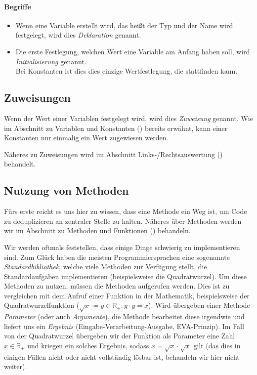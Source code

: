	\paragraph{Begriffe}
		\begin{itemize}
			\item Wenn eine Variable erstellt wird, das heißt der Typ und der Name wird festgelegt, wird dies \textit{Deklaration} genannt.
			\item Die erste Festlegung, welchen Wert eine Variable am Anfang haben soll, wird \textit{Initialisierung} genannt. \\ Bei Konstanten ist dies dies einzige Wertfestlegung, die stattfinden kann.
		\end{itemize}

\subsection{Zuweisungen} \imperativeMark \oopMark
	
	Wenn der Wert einer Variablen festgelegt wird, wird dies \textit{Zuweisung} genannt. Wie im Abschnitt zu Variablen und Konstanten () bereits erwähnt, kann einer Konstanten nur einmalig ein Wert zugewiesen werden.
	
	Näheres zu Zuweisungen wird im Abschnitt Links-/Rechtsauswertung () behandelt.

\subsection{Nutzung von Methoden} \functionalMark \imperativeMark \oopMark
	
	Fürs erste reicht es uns hier zu wissen, dass eine Methode ein Weg ist, um Code zu deduplizieren an zentraler Stelle zu halten. Näheres über Methoden werden wir im Abschnitt zu Methoden und Funktionen () behandeln.
	
	Wir werden oftmals feststellen, dass einige Dinge schwierig zu implementieren sind. Zum Glück haben die meisten Programmiersprachen eine sogenannte \textit{Standardbibliothek}, welche viele Methoden zur Verfügung stellt, die Standardaufgaben implementieren (beispielsweise die Quadratwurzel). Um diese Methoden zu nutzen, müssen die Methoden aufgerufen werden. Dies ist zu vergleichen mit dem Aufruf einer Funktion in der Mathematik, beispielsweise der Quadratwurzelfunktion ($ \sqrt{x} \coloneqq y \in \mathbb{R} _ + : y \cdot y = x $). Wird übergeben einer Methode \textit{Parameter} (oder auch \textit{Argumente}), die Methode bearbeitet diese irgendwie und liefert uns ein \textit{Ergebnis} (Eingabe-Verarbeitung-Ausgabe, EVA-Prinzip). Im Fall von der Quadratwurzel übergeben wir der Funktion als Parameter eine Zahl $ x \in \mathbb{R} _ + $ und kriegen ein solches Ergebnis, sodass $ x = \sqrt{x} \cdot \sqrt{x} $ gilt (das dies in einigen Fällen nicht oder nicht vollständig lösbar ist, behandeln wir hier nicht weiter).


